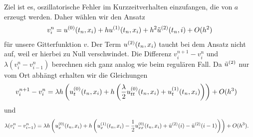 Ziel ist es, oszillatorische Fehler im Kurzzeitverhalten einzufangen, die von $a$ erzeugt werden.
Daher wählen wir den Ansatz
\begin{align}\label{eq:varadv:ansatz}
v^n_i = u^{(0)}(t_n, x_i) + h u^{(1)}(t_n, x_i) + h^2 \tilde u^{(2)}(t_n, i) + O(h^2)
\end{align}
für unsere Gitterfunktion $v$. 
Der Term $u^{(2)}(t_n, x_i)$ taucht bei dem Ansatz nicht auf, weil er hierbei zu Null verschwindet.
Die Differenz $v^{n+1}_i - v^n_i$ und $\lambda (v^n_{i} - v^n_{i-1})$ berechnen sich ganz analog wie beim regulären Fall.
Da $\tilde u^{(2)}$ nur vom Ort abhängt erhalten wir die Gleichungen
\begin{align*}
v^{n+1}_i - v^n_i
&= \lambda h \left( u^{(0)}_t (t_n, x_i) + h \left( \frac \lambda 2 u^{(0)}_{tt}(t_n, x_i) + u^{(1)}_t(t_n, x_i) \right) \right) + O(h^3)
\end{align*}
und
{\small\begin{align*}
\lambda (v^n_{i} - v^n_{i-1})
&= \lambda h \left( u^{(0)}_x(t_n, x_i) + h \left( u^{(1)}_x(t_n, x_i) - \frac 12 u^{(0)}_{xx}(t_n, x_i) + \tilde u^{(2)}(i) - \tilde u^{(2)}(i-1) \right) \right) + O(h^3).
\end{align*}}
